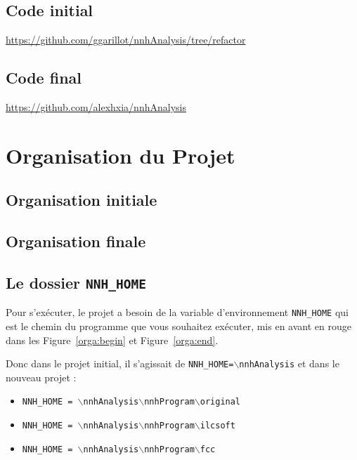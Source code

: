 \documentclass[10pt,a4paper]{report}
\begin{document}
\begin{appendix}
\section{Code initial}

\url{https://github.com/ggarillot/nnhAnalysis/tree/refactor}

\section{Code final}

\url{https://github.com/alexhxia/nnhAnalysis}


\chapter{Organisation du Projet}

\section{Organisation initiale}



\section{Organisation finale}



\section{Le dossier \texttt{NNH\_HOME}}

Pour s'exécuter, le projet a besoin de la variable d'environnement \texttt{NNH\_HOME} qui est le chemin du programme que vous souhaitez exécuter,  mis en avant en rouge dans les Figure~\ref{orga:begin} et Figure~\ref{orga:end}.

Donc dans le projet initial, il s'agissait de \texttt{NNH\_HOME=$\backslash$nnhAnalysis} et dans le nouveau projet :
\begin{itemize}
	\item \texttt{NNH\_HOME = $\backslash$nnhAnalysis$\backslash$nnhProgram$\backslash$original}
	\item \texttt{NNH\_HOME = $\backslash$nnhAnalysis$\backslash$nnhProgram$\backslash$ilcsoft}
	\item \texttt{NNH\_HOME = $\backslash$nnhAnalysis$\backslash$nnhProgram$\backslash$fcc}
\end{itemize}



\end{appendix}
\end{document}

